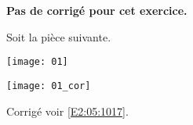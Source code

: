 \normaltrue \difficilefalse \tdifficilefalse
\correctionfalse


\setcounter{numques}{0}

\ifcorrection
\else
\textbf{Pas de corrigé pour cet exercice.}
\fi


\ifprof 
\else
Soit la pièce suivante.
\begin{center}
\texttt{[image: 01]}
\end{center}
 \fi
 
\ifprof\begin{center}
\texttt{[image: 01\_cor]}
\end{center}
\else 
\fi

\ifprof
\else
\begin{flushright}
\footnotesize{Corrigé  voir \ref{E2:05:1017}.}
\end{flushright}%
\fi